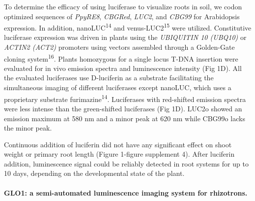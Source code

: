 \documentclass[]{article}
\begin{document}
To determine the efficacy of using luciferase to visualize roots in
soil, we codon optimized sequences of \emph{PpyRE8}, \emph{CBGRed},
\emph{LUC2}, and \emph{CBG99} for Arabidopsis expression. In addition,
nanoLUC\textsuperscript{14} and venus-LUC2\textsuperscript{15} were
utilized. Constitutive luciferase expression was driven in plants using
the \emph{UBIQUITIN 10 (UBQ10)} or \emph{ACTIN2 (ACT2)} promoters using
vectors assembled through a Golden-Gate cloning
system\textsuperscript{16}. Plants homozygous for a single locus T-DNA
insertion were evaluated for in vivo emission spectra and luminescence
intensity (Fig 1D). All the evaluated luciferases use D-luciferin as a
substrate facilitating the simultaneous imaging of different luciferases
except nanoLUC, which uses a proprietary substrate
furimazine\textsuperscript{14}. Luciferases with red-shifted emission
spectra were less intense than the green-shifted luciferases (Fig 1D).
LUC2o showed an emission maximum at 580 nm and a minor peak at 620 nm
while CBG99o lacks the minor peak.

Continuous addition of luciferin did not have any significant effect on
shoot weight or primary root length (Figure 1-figure supplement 4).
After luciferin addition, luminescence signal could be reliably detected
in root systems for up to 10 days, depending on the developmental state
of the plant.

\paragraph{GLO1: a semi-automated luminescence imaging system for
rhizotrons.}\label{glo1-a-semi-automated-luminescence-imaging-system-for-rhizotrons.}
\end{document}
